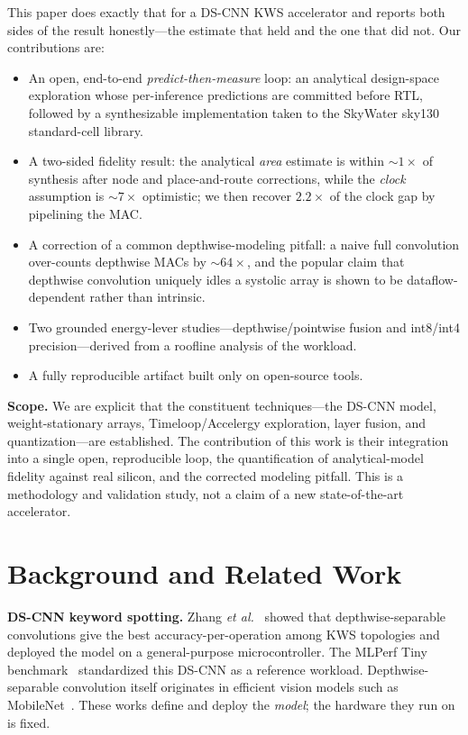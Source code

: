 \documentclass[conference]{IEEEtran}
\newcommand{\x}{\ensuremath{\times}}
\newcommand{\approxs}{\ensuremath{\sim}}
\begin{document}
This paper does exactly that for a DS-CNN KWS accelerator and reports both sides
of the result honestly---the estimate that held and the one that did not. Our
contributions are:
\begin{itemize}
\item An open, end-to-end \emph{predict-then-measure} loop: an analytical
design-space exploration whose per-inference predictions are committed before
RTL, followed by a synthesizable implementation taken to the SkyWater
sky130 standard-cell library.
\item A two-sided fidelity result: the analytical \emph{area} estimate is within
\approxs$1\x$ of synthesis after node and place-and-route corrections, while the
\emph{clock} assumption is \approxs$7\x$ optimistic; we then recover $2.2\x$ of
the clock gap by pipelining the MAC.
\item A correction of a common depthwise-modeling pitfall: a naive full
convolution over-counts depthwise MACs by \approxs$64\x$, and the popular claim
that depthwise convolution uniquely idles a systolic array is shown to be
dataflow-dependent rather than intrinsic.
\item Two grounded energy-lever studies---depthwise/pointwise fusion and
int8/int4 precision---derived from a roofline analysis of the workload.
\item A fully reproducible artifact built only on open-source tools.
\end{itemize}

\noindent\textbf{Scope.} We are explicit that the constituent techniques---the
DS-CNN model, weight-stationary arrays, Timeloop/Accelergy exploration, layer
fusion, and quantization---are established. The contribution of this work is
their integration into a single open, reproducible loop, the quantification of
analytical-model fidelity against real silicon, and the corrected modeling
pitfall. This is a methodology and validation study, not a claim of a new
state-of-the-art accelerator.

\section{Background and Related Work}
\textbf{DS-CNN keyword spotting.} Zhang \emph{et al.}~\cite{helloedge} showed
that depthwise-separable convolutions give the best accuracy-per-operation among
KWS topologies and deployed the model on a general-purpose microcontroller. The
MLPerf Tiny benchmark~\cite{mlperftiny} standardized this DS-CNN as a reference
workload. Depthwise-separable convolution itself originates in efficient vision
models such as MobileNet~\cite{mobilenet}. These works define and deploy the
\emph{model}; the hardware they run on is fixed.
\end{document}
